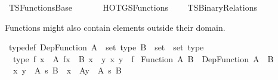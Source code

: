 %
\begin{isabellebody}%
%
%
\isadelimtheory
%
\endisadelimtheory
%
\isatagtheory
\isanewline
\isanewline
{}\isamarkupfalse%
\ TSFunctions{\isacharunderscore}{\kern0pt}Base\isanewline
\ \ \isanewline
\ \ \ \ HOTG{\isachardot}{\kern0pt}SFunctions\isanewline
\ \ \ \ TSBinary{\isacharunderscore}{\kern0pt}Relations\isanewline
{}%
\endisatagtheory
{\isafoldtheory}%
%
\isadelimtheory
%
\endisadelimtheory
%
\isadelimdocument
%
\endisadelimdocument
%
\isatagdocument
%
\isamarkuptrue%
%
\endisatagdocument
{\isafolddocument}%
%
\isadelimdocument
%
\endisadelimdocument
%
\begin{isamarkuptext}%
Functions might also contain elements outside their domain.%
\end{isamarkuptext}\isamarkuptrue%
\isamarkupfalse%
\ {\isacharbrackleft}{\kern0pt}typedef{\isacharbrackright}{\kern0pt}{\isacharcolon}{\kern0pt}\ {\isachardoublequoteopen}Dep{\isacharunderscore}{\kern0pt}Function\ {\isacharparenleft}{\kern0pt}A\ {\isacharcolon}{\kern0pt}{\isacharcolon}{\kern0pt}\ set\ type{\isacharparenright}{\kern0pt}\ {\isacharparenleft}{\kern0pt}B\ {\isacharcolon}{\kern0pt}{\isacharcolon}{\kern0pt}\ set\ {\isasymRightarrow}\ set\ type{\isacharparenright}{\kern0pt}\ {\isasymequiv}\isanewline
\ \ type\ {\isacharparenleft}{\kern0pt}{\isasymlambda}f{\isachardot}{\kern0pt}\ {\isasymforall}x\ {\isacharcolon}{\kern0pt}\ A{\isachardot}{\kern0pt}\ f{\isacharbackquote}{\kern0pt}x\ {\isacharcolon}{\kern0pt}\ B\ x\ {\isasymand}\ {\isacharparenleft}{\kern0pt}{\isasymexists}{\isacharbang}{\kern0pt}y{\isachardot}{\kern0pt}\ {\isasymlangle}x{\isacharcomma}{\kern0pt}\ y{\isasymrangle}\ {\isasymin}\ f{\isacharparenright}{\kern0pt}{\isacharparenright}{\kern0pt}{\isachardoublequoteclose}\isanewline
\isanewline
{}\isamarkupfalse%
\ {\isachardoublequoteopen}Function\ A\ B\ {\isasymequiv}\ Dep{\isacharunderscore}{\kern0pt}Function\ A\ {\isacharparenleft}{\kern0pt}{\isasymlambda}{\isacharunderscore}{\kern0pt}{\isachardot}{\kern0pt}\ B{\isacharparenright}{\kern0pt}{\isachardoublequoteclose}\isanewline
\isanewline
{}\isamarkupfalse%
\isanewline
\ \ {\isachardoublequoteopen}{\isacharparenleft}{\kern0pt}x\ y\ {\isasymin}\ A{\isacharparenright}{\kern0pt}\ {\isasymrightarrow}s\ B{\isachardoublequoteclose}\ {\isasymrightharpoonup}\ {\isachardoublequoteopen}{\isacharparenleft}{\kern0pt}x\ {\isasymin}\ A{\isacharparenright}{\kern0pt}{\isacharparenleft}{\kern0pt}y\ {\isasymin}\ A{\isacharparenright}{\kern0pt}\ {\isasymrightarrow}s\ B{\isachardoublequoteclose}\isanewline

\end{isabellebody}
